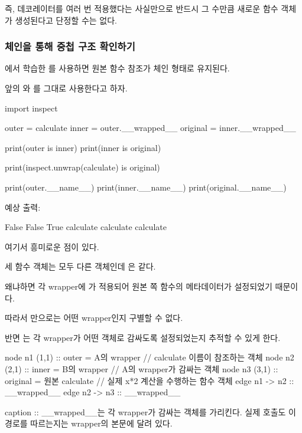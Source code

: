 즉, 데코레이터를 여러 번 적용했다는 사실만으로 반드시 그 수만큼 새로운 함수 객체가 생성된다고 단정할 수는 없다.

\subsubsection{ 체인을 통해 중첩 구조 확인하기}

에서 학습한 를 사용하면 원본 함수 참조가 체인 형태로 유지된다.

앞의 와 를 그대로 사용한다고 하자.

\begin{dhkcode}
import inspect

outer = calculate
inner = outer.__wrapped__
original = inner.__wrapped__

print(outer is inner)
print(inner is original)

print(inspect.unwrap(calculate) is original)

print(outer.__name__)
print(inner.__name__)
print(original.__name__)
\end{dhkcode}

예상 출력:

\begin{dhkzsh}
False
False
True
calculate
calculate
calculate
\end{dhkzsh}

여기서 흥미로운 점이 있다.

세 함수 객체는 모두 다른 객체인데 은 같다.

왜냐하면 각 wrapper에 가 적용되어 원본 쪽 함수의 메타데이터가 설정되었기 때문이다.

따라서 만으로는 어떤 wrapper인지 구별할 수 없다.

반면 는 각 wrapper가 어떤 객체로 감싸도록 설정되었는지 추적할 수 있게 한다.

\begin{dhkgraph}[uniform]
node n1 (1,1) :: outer = A의 wrapper // calculate 이름이 참조하는 객체
node n2 (2,1) :: inner = B의 wrapper // A의 wrapper가 감싸는 객체
node n3 (3,1) :: original = 원본 calculate // 실제 x*2 계산을 수행하는 함수 객체
edge n1 -> n2 :: __wrapped__
edge n2 -> n3 :: __wrapped__

caption :: __wrapped__는 각 wrapper가 감싸는 객체를 가리킨다. 실제 호출도 이 경로를 따르는지는 wrapper의 본문에 달려 있다.
\end{dhkgraph}

